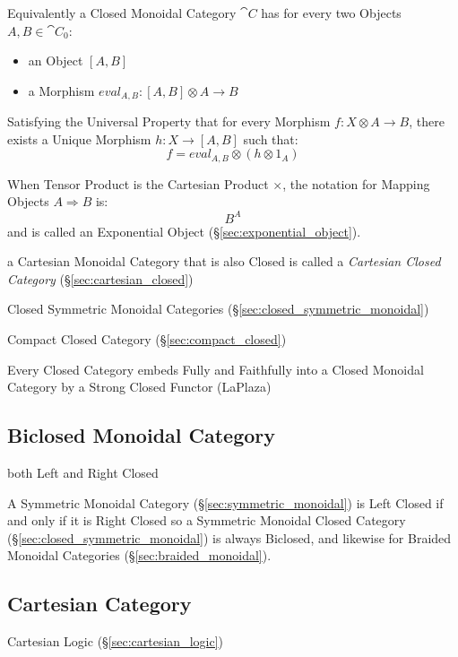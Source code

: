 Equivalently a Closed Monoidal Category $\cat{C}$ has for every two
Objects $A,B \in \cat{C}_0$:
\begin{itemize}
  \item an Object $[A,B]$
  \item a Morphism $eval_{A,B} : [A,B] \otimes A \rightarrow B$
\end{itemize}
Satisfying the Universal Property that for every Morphism $f : X
\otimes A \rightarrow B$, there exists a Unique Morphism $h : X
\rightarrow [A,B]$ such that:
\[
  f = eval_{A,B} \otimes (h \otimes 1_A)
\]

When Tensor Product is the Cartesian Product $\times$, the notation
for Mapping Objects $A \Rightarrow B$ is:
\[
  B^A
\]
and is called an Exponential Object (\S\ref{sec:exponential_object}).

a Cartesian Monoidal Category that is also Closed is called a \emph{Cartesian
  Closed Category} (\S\ref{sec:cartesian_closed})

Closed Symmetric Monoidal Categories
(\S\ref{sec:closed_symmetric_monoidal})

Compact Closed Category (\S\ref{sec:compact_closed})

Every Closed Category embeds Fully and Faithfully into a Closed
Monoidal Category by a Strong Closed Functor (LaPlaza)



\subsection{Biclosed Monoidal Category}\label{sec:biclosed_monoidal}

both Left and Right Closed

A Symmetric Monoidal Category (\S\ref{sec:symmetric_monoidal}) is Left
Closed if and only if it is Right Closed so a Symmetric Monoidal
Closed Category (\S\ref{sec:closed_symmetric_monoidal}) is always
Biclosed, and likewise for Braided Monoidal Categories
(\S\ref{sec:braided_monoidal}).



\subsection{Cartesian Category}\label{sec:cartesian_category}

Cartesian Logic (\S\ref{sec:cartesian_logic})

